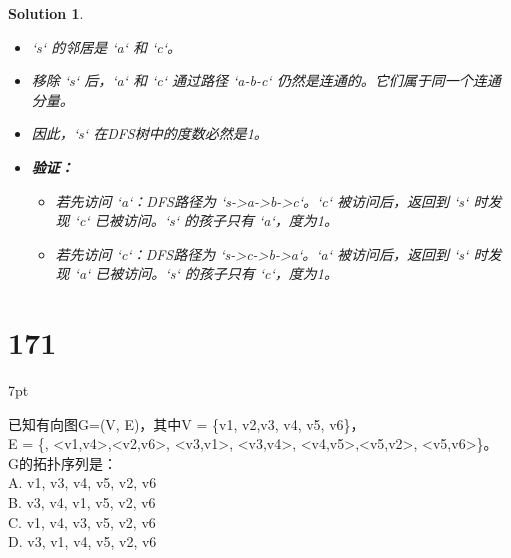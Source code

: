 \documentclass[UTF8]{report}
\newtheorem{solution}{Solution}
\theoremstyle{MyLineTheoremStyle} %
\theoremstyle{MyBlockTheoremStyle} %
\theoremstyle{MySubsubsectionStyle} %
\newenvironment{graybox}{%
        \def\FrameCommand{%
        \hspace{1pt}%
        {\color{gray}\small \vrule width 2pt}%
        {\color{graybox_color}\vrule width 4pt}%
        \colorbox{graybox_color}%
        }%
        \MakeFramed{\advance\hsize-\width\FrameRestore}%
        \noindent\hspace{-4.55pt}%
        \begin{adjustwidth}{}{7pt}%
        \vspace{2pt}\vspace{2pt}%
        }
        {%
        \vspace{2pt}\end{adjustwidth}\endMakeFramed%
        }
\begin{document}
\begin{solution}
\begin{enumerate}
\begin{center}
    \end{center}
    \begin{itemize}
        \item `s` 的邻居是 `a` 和 `c`。
        \item 移除 `s` 后，`a` 和 `c` 通过路径 `a-b-c` 仍然是连通的。它们属于同一个连通分量。
        \item 因此，`s` 在DFS树中的度数必然是1。
        \item \textbf{验证：}
            \begin{itemize}
                \item 若先访问 `a`：DFS路径为 `s->a->b->c`。`c` 被访问后，返回到 `s` 时发现 `c` 已被访问。`s` 的孩子只有 `a`，度为1。
                \item 若先访问 `c`：DFS路径为 `s->c->b->a`。`a` 被访问后，返回到 `s` 时发现 `a` 已被访问。`s` 的孩子只有 `c`，度为1。
            \end{itemize}
    \end{itemize}
\end{enumerate}
\end{solution}



\section*{171}
\begin{graybox}
已知有向图G=(V, E)，其中V = \{v1, v2,v3, v4, v5, v6\}，\\
E = \{<v1,v2>, <v1,v4>,<v2,v6>, <v3,v1>, <v3,v4>, <v4,v5>,<v5,v2>, <v5,v6>\}。\\
G的拓扑序列是：\\
A. v1, v3, v4, v5, v2, v6\\
B. v3, v4, v1, v5, v2, v6\\
C. v1, v4, v3, v5, v2, v6\\
D. v3, v1, v4, v5, v2, v6\\
\end{graybox}
\end{document}
